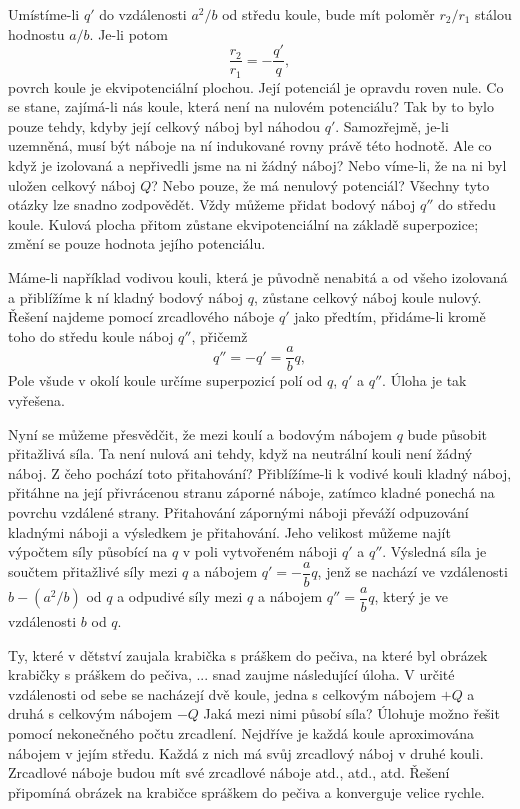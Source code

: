 {    Umístíme-li \(q'\) do vzdálenosti \(a^2/b\) od středu koule, bude mít poloměr \(r_2/r_1\) 
    stálou hodnostu \(a/b\). Je-li potom
    \begin{equation}\label{fyz:eq290}
      \dfrac{r_2}{r_1} = -\dfrac{q'}{q},
    \end{equation}
    povrch koule je ekvipotenciální plochou. Její potenciál je opravdu roven nule. Co se stane, 
    zajímá-li nás koule, která není na nulovém potenciálu? Tak by to bylo pouze tehdy, kdyby její 
    celkový náboj byl náhodou \(q'\). Samozřejmě, je-li uzemněná, musí být náboje na ní indukované 
    rovny právě této hodnotě. Ale co když je izolovaná a nepřivedli jsme na ni žádný náboj? Nebo 
    víme-li, že na ni byl uložen celkový náboj \(Q\)? Nebo pouze, že má nenulový potenciál? Všechny 
    tyto otázky lze snadno zodpovědět. Vždy můžeme přidat bodový náboj \(q''\) do středu koule. 
    Kulová plocha přitom zůstane ekvipotenciální na základě superpozice; změní se pouze hodnota 
    jejího potenciálu. 
    
    Máme-li například vodivou kouli, která je původně nenabitá a od všeho izolovaná a přiblížíme k 
    ní kladný bodový náboj \(q\), zůstane celkový náboj koule nulový. Řešení najdeme 
    pomocí zrcadlového náboje \(q'\) jako předtím, přidáme-li kromě toho do středu koule náboj 
    \(q''\), přičemž
    \begin{equation}\label{fyz:eq291}
      q'' = -q' = \dfrac{a}{b}q,
    \end{equation}
    Pole všude v okolí koule určíme superpozicí polí od \(q\), \(q'\) a \(q''\). Úloha je tak 
    vyřešena.
    
    Nyní se můžeme přesvědčit, že mezi koulí a bodovým nábojem \(q\) bude působit přitažlivá síla. 
    Ta není nulová ani tehdy, když na neutrální kouli není žádný náboj. Z čeho pochází toto 
    přitahování? Přiblížíme-li k vodivé kouli kladný náboj, přitáhne na její přivrácenou stranu 
    záporné náboje, zatímco kladné ponechá na povrchu vzdálené strany. Přitahování zápornými náboji 
    převáží odpuzování kladnými náboji a výsledkem je přitahování. Jeho velikost můžeme najít 
    výpočtem síly působící na \(q\) v poli vytvořeném náboji \(q'\) a \(q''\). Výsledná síla je 
    součtem přitažlivé síly mezi \(q\) a nábojem \(q' = -\dfrac{a}{b}q\), jenž se nachází ve 
    vzdálenosti \(b - (a^2/b)\) od \(q\) a odpudivé síly mezi \(q\) a nábojem \(q'' = 
    \dfrac{a}{b}q\), který je ve vzdálenosti \(b\) od \(q\). 
    
    Ty, které v dětství zaujala krabička s práškem do pečiva, na které byl obrázek krabičky s 
    práškem do pečiva, ... snad zaujme následující úloha. V určité vzdálenosti od sebe se 
    nacházejí dvě koule, jedna s celkovým nábojem \(+Q\) a druhá s celkovým nábojem  \(-Q\) Jaká 
    mezi nimi působí síla? Úlohuje možno řešit pomocí nekonečného počtu zrcadlení. Nejdříve je 
    každá koule aproximována nábojem v jejím středu. Každá z nich má svůj zrcadlový náboj v druhé 
    kouli. Zrcadlové náboje budou mít své zrcadlové náboje atd., atd., atd. Řešení připomíná 
    obrázek na krabičce spráškem do pečiva a konverguje velice rychle.

}
